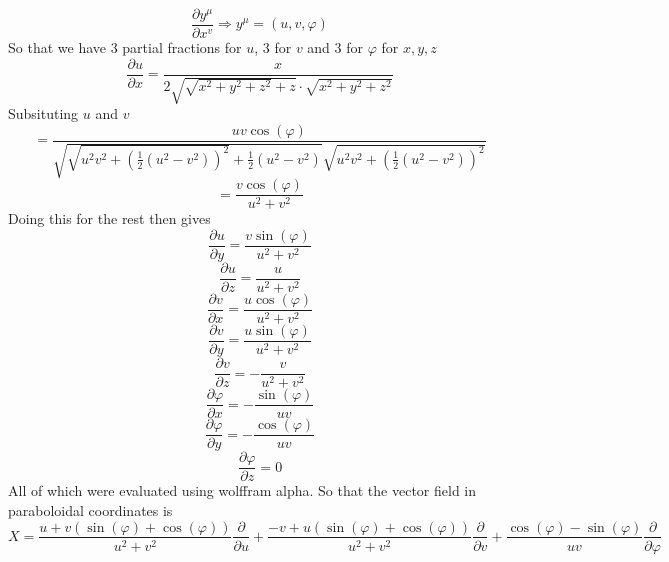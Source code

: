 \documentclass[12pt]{article}
\begin{document}
\begin{enumerate}
$$ \frac{\partial y^{\mu} }{\partial x^v} \Rightarrow y^{\mu} = (u,v,\varphi) $$
So that we have 3 partial fractions for $u$, 3 for $v$ and 3 for $\varphi$ for $x,y,z$ 
$$ \frac{\partial u}{\partial x} = \frac{x}{2 \sqrt{\sqrt{x^2 + y^2 + z^2 } + z} \cdot \sqrt{x^2 + y^2 +z^2}} $$
Subsituting $u$ and $v$ 
$$ = \frac{uv \cos(\varphi)}{\sqrt{\sqrt{u^2 v^2 + ( \frac{1}{2} (u^2 - v^2))^2} + \frac{1}{2} (u^2 - v^2) } \sqrt{u^2 v^2 + (\frac{1}{2} (u^2 -v^2))^2}} $$
$$ = \frac{ v \cos (\varphi)}{u^2 + v^2} $$
Doing this for the rest then gives 
$$ \frac{\partial u}{\partial y} = \frac{ v \sin (\varphi)}{u^2 + v^2} $$
$$ \frac{\partial u}{\partial z} = \frac{ u }{u^2 + v^2} $$
$$ \frac{\partial v}{\partial x} = \frac{ u \cos (\varphi)}{u^2 + v^2} $$
$$ \frac{\partial v}{\partial y} = \frac{ u \sin (\varphi)}{u^2 + v^2} $$
$$ \frac{\partial v}{\partial z} = -\frac{ v }{u^2 + v^2} $$
$$ \frac{\partial \varphi}{\partial x} = - \frac{ \sin (\varphi)}{uv} $$
$$ \frac{\partial \varphi}{\partial y} = - \frac{ \cos (\varphi)}{uv} $$
$$ \frac{\partial \varphi }{\partial z} = 0 $$
All of which were evaluated using wolffram alpha. So that the vector field in paraboloidal coordinates is 
$$ X = \frac{u + v( \sin(\varphi) + \cos(\varphi) ) }{u^2 + v^2} \frac{\partial}{\partial u} + \frac{-v + u(\sin(\varphi) + \cos(\varphi) )}{u^2 + v^2} \frac{\partial}{\partial v} + \frac{\cos(\varphi) - \sin(\varphi) }{uv} \frac{\partial}{\partial \varphi} $$


\end{enumerate}
\end{document}
